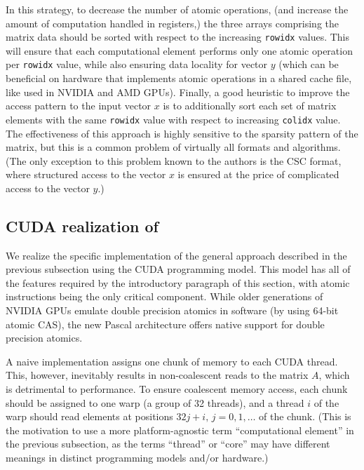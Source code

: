 In this strategy, to decrease the number of atomic operations, (and increase the amount of
computation handled in registers,) the three arrays comprising the matrix data
should be sorted with respect to the increasing \texttt{rowidx} values.
This will ensure that each computational element performs only one atomic
operation per \texttt{rowidx} value, while also ensuring data locality
for vector $y$ (which can be beneficial on hardware that implements
atomic operations in a shared cache file, like used in NVIDIA and AMD
GPUs).
Finally, a good heuristic to improve the access pattern to the input vector $x$
is to additionally sort each set of matrix elements with the same
\texttt{rowidx} value with respect to increasing \texttt{colidx} value.
The effectiveness of this approach is highly sensitive to the sparsity pattern of
the matrix, but this is a common problem of virtually all \spmv
formats and algorithms.
(The only exception to this problem known to the authors is the CSC format, 
where structured access to
the vector $x$ is ensured at the price of complicated access to the vector $y$.)

\subsection{CUDA realization of \coo \spmv}
\label{2017-coo-spmv:ss:cuda-coo-spmv}

We realize the specific implementation of the general approach described in 
the previous subsection using the CUDA programming model.
This model has all of the features required by the introductory paragraph of
this section, with atomic instructions being the only critical component.
While older generations of NVIDIA GPUs emulate double precision atomics in
software (by using 64-bit atomic CAS), the new Pascal architecture offers
native support for double precision atomics.

A naive implementation assigns one chunk of memory to
each CUDA thread. This, however, inevitably results in non-coalescent reads to the 
matrix $A$, which is detrimental to performance.
To ensure coalescent memory access, each chunk should be assigned to one warp
(a group of 32 threads), and a thread $i$ of the warp should read elements at
positions $32j + i,\, j = 0,1,\ldots$ of the chunk.
(This is the motivation to use a more platform-agnostic term ``computational
element'' in the previous subsection, as the terms ``thread'' or ``core'' may
have different meanings in distinct programming models and/or hardware.)


